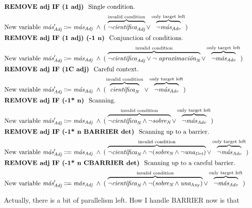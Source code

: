 \begin{align}
%
\intertext{\cgrule{REMOVE adj IF (1 adj)} Single condition.} 
\text{New variable } \mas{}'_\adj 
      & \eqdef \masAdj\ 
        \wedge\: ( \; \ob{\neg\cientificaAdj}^{\invConds} 
        \vee  \ob{\neg\masAdv}^{\onlyTrgLeft} ) \\
%
%
\intertext{\cgrule{REMOVE adj IF (1 adj) (-1 n)} Conjunction of conditions.}
\text{New variable } \mas{}'_\adj 
      & \eqdef \masAdj\ 
       \wedge\: ( \; \ob{\neg\cientificaAdj \vee \neg\aproximacionN}^{\invConds} 
       \vee  \ob{\neg\masAdv}^{\onlyTrgLeft} ) \\
%
%
\intertext{\cgrule{REMOVE adj IF (1C adj)} Careful context.} %
  \text{New variable } \mas{}'_\adj 
     & \eqdef \masAdj\ 
     \wedge\: ( \ob{\cientificaN}^{\invConds} 
     \vee \ob{\neg\masAdv}^{\onlyTrgLeft}  ) \\
%
%
\intertext{\cgrule{REMOVE adj IF (-1* n)} Scanning.}
  \text{New variable } \mas{}'_\adj 
     & \eqdef \masAdj\ 
     \wedge\: ( \; \ob{\neg\cientificaN \wedge \neg\sobreN}^{\invConds} 
     \vee \ob{\neg\masAdv}^{\onlyTrgLeft} ) \\
%
%
\intertext{\cgrule{REMOVE adj IF (-1* n BARRIER det)} Scanning up to a barrier. }
  \text{New variable } \mas{}'_\adj 
     & \eqdef \masAdj\ 
     \wedge\: ( \; \ob{\neg\cientificaN \wedge \neg(\sobreN \wedge \neg\unaDet)}^{\invConds} 
     \vee \ob{\neg\masAdv}^{\onlyTrgLeft} )  \\
%
%
\intertext{\cgrule{REMOVE adj IF (-1* n CBARRIER det)} Scanning up to a careful barrier. }
  \text{New variable } \mas{}'_\adj 
     & \eqdef \masAdj\ 
     \wedge\: ( \; \ob{\neg\cientificaN \wedge \neg(\sobreN \wedge \unaAny)}^{\invConds} 
     \vee \ob{\neg\masAdv}^{\onlyTrgLeft} ) 
\end{align}

Actually, there is a bit of parallelism left. How I handle BARRIER now is that 



